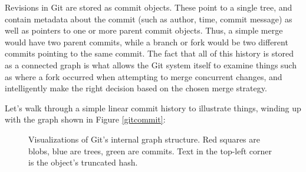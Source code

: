 \documentclass[]{article}
\begin{document}
Revisions in Git are stored as commit objects. These point to a single tree, and contain metadata about the commit (such as author, time, commit message) as well as pointers to one or more parent commit objects. Thus, a simple merge would have two parent commits, while a branch or fork would be two different commits pointing to the same commit. The fact that all of this history is stored as a connected graph is what allows the Git system itself to examine things such as where a fork occurred when attempting to merge concurrent changes, and intelligently make the right decision based on the chosen merge strategy.

Let's walk through a simple linear commit history to illustrate things, winding up with the graph shown in Figure \ref{gitcommit}:

\begin{figure}[h]
  \centering
  \qquad
  \caption[]%
    {Visualizations of Git's internal graph structure. Red squares are blobs, blue are trees, green are commits. Text in the top-left corner is the object's truncated hash.}
\end{figure}
\end{document}
